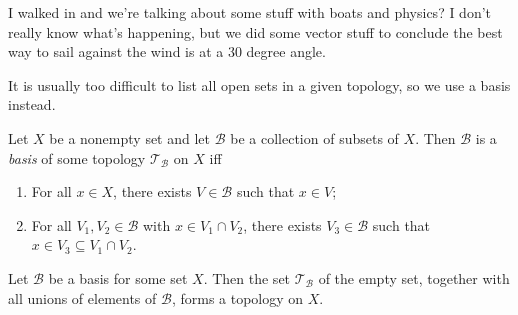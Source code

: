 I walked in and we're talking about some stuff with boats and physics? I don't really know what's happening, but we did some vector stuff to conclude the best way to sail against the wind is at a 30 degree angle.

It is usually too difficult to list all open sets in a given topology, so we use a basis instead.
\begin{definition}[Basis]\label{dfn:1.4}
	Let $X$ be a nonempty set and let $\mathcal{B} $ be a collection of subsets of $X$. Then $\mathcal{B} $ is a \emph{basis} of some topology $\mathcal{T}_{\mathcal{B} } $ on $X$ iff
	\begin{enumerate}
		\item For all $x\in X$, there exists $V\in \mathcal{B} $ such that $x\in V$;
		\item For all $V_1,V_2\in \mathcal{B} $ with $x\in V_1\cap V_2$, there exists $V_3\in \mathcal{B} $ such that $x\in V_3\subseteq V_1\cap V_2$.
	\end{enumerate}
\end{definition}
\begin{proposition}\label{prp:1.1}
	Let $\mathcal{B} $ be a basis for some set $X$. Then the set $\mathcal{T}_{\mathcal{B} }$ of the empty set, together with  all unions of elements of $\mathcal{B} $,  forms a topology on $X$.
\end{proposition}
